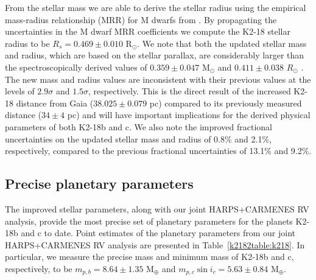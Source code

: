 From the stellar mass we are able to derive the stellar radius using the empirical mass-radius relationship (MRR)
for M dwarfs from \cite{boyajian12}. By propagating the uncertainties in the M dwarf MRR
coefficients we compute the K2-18 stellar radius to be $R_s=0.469\pm 0.010$ R$_{\odot}$. We note that both the
updated stellar mass and radius, which are based on the stellar parallax, are considerably larger than the
spectroscopically derived values of $0.359\pm 0.047$ M$_{\odot}$ and $0.411\pm 0.038$ $R_{\odot}$
\citep{benneke17}. The new mass and radius values are inconsistent with their previous values at the levels of
$2.9\sigma$ and $1.5\sigma$, respectively. This is the direct result of the increased K2-18 distance from Gaia 
($38.025\pm 0.079$ pc) compared to its previously measured distance ($34\pm 4$ pc) and 
will have important implications for the derived physical parameters of
both K2-18b and c. We also note the improved fractional uncertainties on the updated stellar mass and radius
of 0.8\% and 2.1\%, respectively, compared to the previous fractional uncertainties of
13.1\% and 9.2\%.


\subsection{Precise planetary parameters}
The improved stellar parameters, along with our joint HARPS+CARMENES RV analysis, provide the most
precise set of planetary parameters for the planets K2-18b and c to date. Point estimates of the planetary
parameters from our joint HARPS+CARMENES RV analysis are presented in Table~\ref{k2182table:k218}. In
particular, we measure the precise mass and minimum mass of K2-18b and c, respectively, to be
$m_{p,b}=8.64\pm 1.35$ M$_{\oplus}$ and $m_{p,c}\sin{i_c}=5.63\pm 0.84$ M$_{\oplus}$. \\

